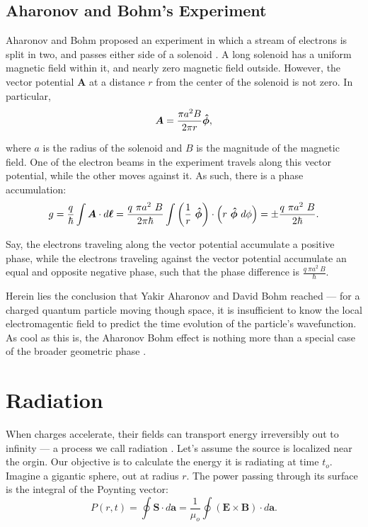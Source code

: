 \documentclass{article}
\begin{document}
\subsection{Aharonov and Bohm's Experiment}

Aharonov and Bohm proposed an experiment in which a stream of electrons is split in two, and passes either side of a solenoid \cite{aharonovbohm}. A long solenoid has a uniform magnetic field within it, and nearly zero magnetic field outside. However, the vector potential $\bm{A}$ at a distance $r$ from the center of the solenoid is not zero. In particular,
\begin{equation*}
	\bm{A} = \frac{\pi a^2 B}{2\pi r} \bm{\hat{\phi}},
\end{equation*}

where $a$ is the radius of the solenoid and $B$ is the magnitude of the magnetic field. One of the electron beams in the experiment travels along this vector potential, while the other moves against it. As such, there is a phase accumulation:
\begin{equation*}
    g = \frac{q}{\hbar} \int \bm{A} \cdot d\bm{\ell} = \frac{q\ \pi a^2\ B}{2\pi\hbar} \int \left( \frac{1}{r}\ \phihat \right) \cdot \left( r\ \phihat\ d\phi \right) = \pm \frac{q\ \pi a^2\ B}{2\hbar}.
\end{equation*}

Say, the electrons traveling along the vector potential accumulate a positive phase, while the electrons traveling against the vector potential accumulate an equal and opposite negative phase, such that the phase difference is $\displaystyle \frac{q\ \pi a^2\ B}{\hbar}$.

Herein lies the conclusion that Yakir Aharonov and David Bohm reached --- for a charged quantum particle moving though space, it is insufficient to know the local electromagentic field to predict the time evolution of the particle's wavefunction. As cool as this is, the Aharonov Bohm effect is nothing more than a special case of the broader geometric phase \cite{aharonovbohm}.

\section{Radiation}

When charges accelerate, their fields can transport energy irreversibly out to infinity --- a process we call radiation \cite{griffiths}. Let's assume the source is localized near the orgin. Our objective is to calculate the energy it is radiating at time $t_o$. Imagine a gigantic sphere, out at radius $r$. The power passing through its surface is the integral of the Poynting vector:
\begin{equation*}
    P(r, t) = \oint \bm{S} \cdot d\bm{a} = \frac{1}{\mu_o} \oint \left( \bm{E} \times \bm{B} \right) \cdot d\bm{a}.
\end{equation*}
\end{document}
